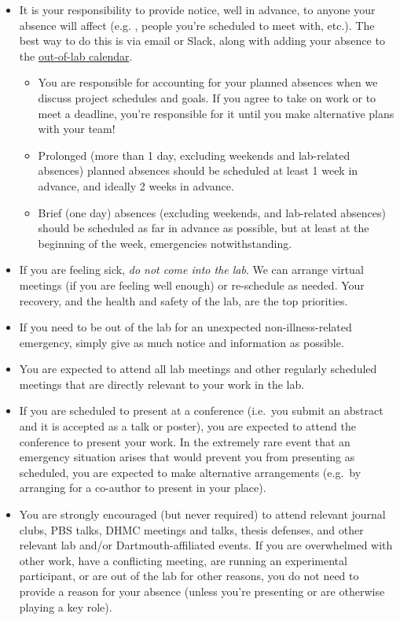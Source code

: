\documentclass{tufte-book} %
\begin{document}
\begin{itemize}
\item It is your responsibility to provide notice, well in advance, to anyone your absence will
  affect (e.g. \director, people you're scheduled to
  meet with, etc.).  The best way to do this is via email or Slack, along with adding your
  absence to the
  \hyperref[sec: scheduling]{out-of-lab
    calendar}.
\begin{itemize}
\item You are responsible for accounting for your planned absences
  when we discuss project schedules and goals.  If you agree to take on work
  or to meet a deadline, you're responsible for it until you make
  alternative plans with your team!
\item Prolonged (more than 1 day, excluding weekends and
  lab-related absences) planned
  absences should be scheduled at least 1 week in advance, and ideally
  2 weeks in advance.
\item Brief (one day) absences (excluding weekends, and lab-related
  absences) should be scheduled as far in advance as possible, but at
  least at the beginning of the week, emergencies notwithstanding.
\end{itemize}

\item If you are feeling sick, \textit{do not come into the lab}.  We can
  arrange virtual meetings (if you are feeling well enough) or
  re-schedule as needed.  Your recovery, and the health and safety of the lab, are the top
  priorities.

\item If you need to be out of the lab for an unexpected non-illness-related
  emergency, simply give as much notice and information as possible.

\item You are expected to attend all lab meetings and other regularly
  scheduled meetings that are directly relevant to your work in the
  lab.

\item If you are scheduled to present at a conference (i.e.\ you
  submit an abstract and it is accepted as a talk or
  poster), you are expected to attend the conference to present your
  work.  In the extremely rare event that an emergency situation
  arises that would prevent you from presenting as scheduled, you are
  expected to make alternative arrangements (e.g.\ by arranging for a
  co-author to present in your place).

\item You are strongly encouraged (but never required) to attend
  relevant journal clubs, PBS talks, DHMC
  meetings and talks, thesis defenses, and other relevant lab and/or
  Dartmouth-affiliated events.  If you are overwhelmed with other
  work, have a conflicting meeting, are running an experimental
  participant, or are out of the lab for other reasons, you do not
  need to provide a reason for your absence (unless you're presenting
  or are otherwise playing a key role).
\end{itemize}
\end{document}
